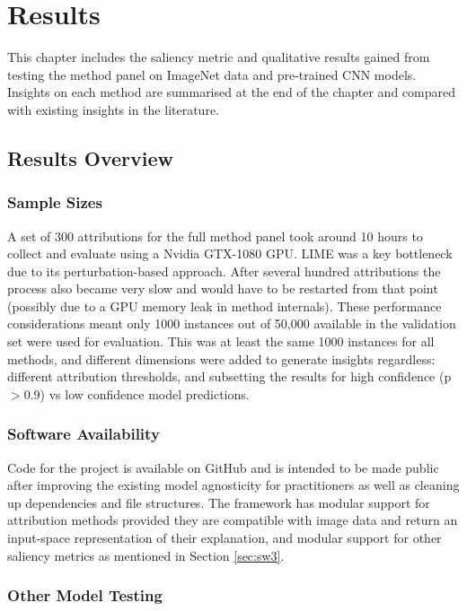\documentclass[main]{subfiles}
\begin{document}
\chapter{Results}


This chapter includes the saliency metric and qualitative results gained from testing the method panel on ImageNet data and pre-trained CNN models. Insights on each method are summarised at the end of the chapter and compared with existing insights in the literature.

\section{Results Overview}

\subsection{Sample Sizes}  \label{sec:data_collection}
A set of 300 attributions for the full method panel took around 10 hours to collect and evaluate using a Nvidia GTX-1080 GPU. LIME was a key bottleneck due to its perturbation-based approach. After several hundred attributions the process also became very slow and would have to be restarted from that point (possibly due to a GPU memory leak in method internals). These performance considerations meant only 1000 instances out of 50,000 available in the validation set were used for evaluation. This was at least the same 1000 instances for all methods, and different dimensions were added to generate insights regardless: different attribution thresholds, and subsetting the results for high confidence (p $>0.9$) vs low confidence model predictions.

\subsection{Software Availability}

Code for the project is available on GitHub and is intended to be made public after improving the existing model agnosticity for practitioners as well as cleaning up dependencies and file structures. The framework has modular support for attribution methods provided they are compatible with image data and return an input-space representation of their explanation, and modular support for other saliency metrics as mentioned in Section \ref{sec:sw3}.


\subsection{Other Model Testing}
\end{document}
